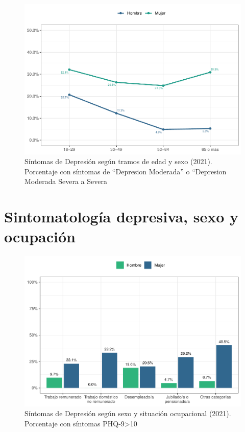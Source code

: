 \documentclass[
  12pt,
]{book}
\begin{document}
\begin{figure}

{\centering \includegraphics{reporte-elsoc_files/figure-latex/depre-edad-sexo-1} 

}

\caption{Síntomas de Depresión según tramos de edad y sexo (2021). Porcentaje con síntomas de “Depresion Moderada” o “Depresion Moderada Severa a Severa}\label{fig:depre-edad-sexo}
\end{figure}

\hypertarget{sintomatologuxeda-depresiva-sexo-y-ocupaciuxf3n}{%
\section{Sintomatología depresiva, sexo y ocupación}\label{sintomatologuxeda-depresiva-sexo-y-ocupaciuxf3n}}

\begin{figure}

{\centering \includegraphics{reporte-elsoc_files/figure-latex/depre-labstat-1} 

}

\caption{Síntomas de Depresión según sexo y situación ocupacional (2021). Porcentaje con síntomas PHQ-9>10}\label{fig:depre-labstat}
\end{figure}
\end{document}
